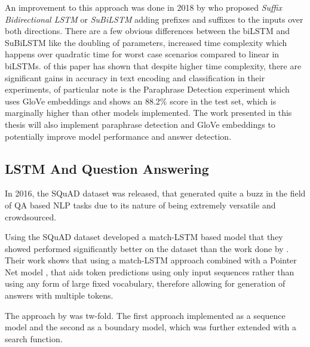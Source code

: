 \documentclass[a4paper,12pt]{report}
\begin{document}
			  An improvement to this approach was done in 2018 by \citep{lstmSubilstm} who proposed \textit{Suffix Bidirectional LSTM} or \textit{SuBiLSTM} adding prefixes and suffixes to the inputs over both directions.  There are a few obvious differences between the biLSTM and SuBiLSTM like the doubling of parameters, increased time complexity which happens over quadratic time for worst case scenarios compared to linear in biLSTMs.
			  \citep{lstmSubilstm} of this paper has shown that despite higher time complexity, there are significant gains in accuracy in text encoding and classification in their experiments, of particular note is the Paraphrase Detection experiment which uses GloVe embeddings and shows an 88.2\% score in the test set, which is marginally higher than other models implemented.
			  The work presented in this thesis will also implement paraphrase detection and GloVe embeddings to potentially improve model performance and answer detection.

			  \subsection{LSTM And Question Answering}\label{c2lstmqa}
             In 2016, the SQuAD dataset \citep{dataset1} was released, that generated quite a buzz in the field of QA based NLP tasks due to its nature of being extremely versatile and crowdsourced.

             Using the SQuAD dataset \citep{lstmhu2016question} developed a match-LSTM \citep{lstmMatch} based model that they showed performed significantly better on the dataset than the work done by \citep{dataset1}. Their work shows that using a match-LSTM approach combined with a Pointer Net model \citep{lstmPointer}, that aids token predictions using only input sequences rather than using any form of large fixed vocabulary, therefore allowing for generation of answers with multiple tokens.

             The approach by \citep{lstmhu2016question} was tw-fold. The first approach implemented as a sequence model and the second as a boundary model, which was further extended with a search function.
\end{document}

